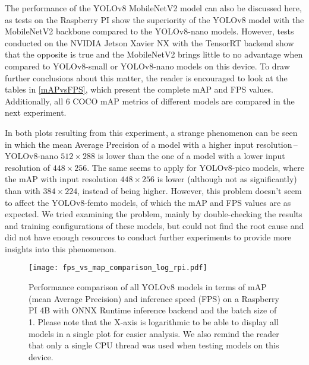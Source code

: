 The performance of the YOLOv8 MobileNetV2 model can also be discussed here, as
tests on the Raspberry PI show the superiority of the YOLOv8 model with the
MobileNetV2 backbone compared to the YOLOv8-nano models. However, tests
conducted on the NVIDIA Jetson Xavier NX with the TensorRT backend show that the
opposite is true and the MobileNetV2 brings little to no advantage when compared
to YOLOv8-small or YOLOv8-nano models on this device. To draw further
conclusions about this matter, the reader is encouraged to look at the tables in
\autoref{mAPvsFPS}, which present the complete mAP and FPS values. Additionally,
all 6 COCO mAP metrics of different models are compared in the next experiment.

In both plots resulting from this experiment, a strange phenomenon can be seen
in which the mean Average Precision of a model with a higher input
resolution\,--\,YOLOv8-nano $512 \times 288$ is lower than the one of a model
with a lower input resolution of $448 \times 256$. The same seems to apply for
YOLOv8-pico models, where the mAP with input resolution $448 \times 256$ is
lower (although not as significantly) than with $384 \times 224$, instead of
being higher. However, this problem doesn't seem to affect the YOLOv8-femto
models, of which the mAP and FPS values are as expected. We tried examining the
problem, mainly by double-checking the results and training configurations of
these models, but could not find the root cause and did not have enough
resources to conduct further experiments to provide more insights into this
phenomenon.

\begin{figure}[H]
    \begin{framed}
        \centering
        \texttt{[image: fps\_vs\_map\_comparison\_log\_rpi.pdf]}
        \caption{Performance comparison of all YOLOv8 models in terms of mAP
        (mean Average Precision) and inference speed (FPS) on a Raspberry PI 4B
        with ONNX Runtime inference backend and the batch size of 1. Please note
        that the X-axis is logarithmic to be able to display all models in a
        single plot for easier analysis. We also remind the reader that only a
        single CPU thread was used when testing models on this device.}
        \label{FPSvsmAPComparisonRPI}
    \end{framed}
\end{figure}

